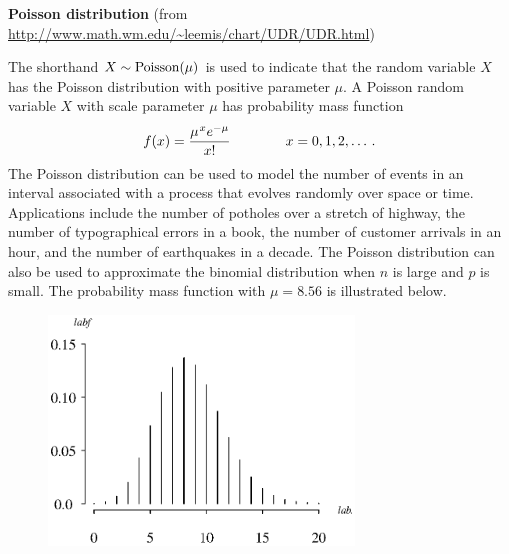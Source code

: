\documentclass[12pt,fullpage]{article}
\begin{document}
\noindent
{\bf Poisson distribution} (from \color{blue}\url{http://www.math.wm.edu/~leemis/chart/UDR/UDR.html}\color{black})

\noindent
The shorthand $X \sim {\rm Poisson}(\mu)$ is used to indicate that the
random variable $X$ has the Poisson distribution with positive parameter $\mu$.
A Poisson random variable $X$ with scale parameter $\mu$ has probability mass function 
$$
f(x) = \frac{\mu ^ {\kern 0.08 em x} e ^ {-\mu}} {x!} \qquad \qquad x = 0,1,2 , \ldots \,.
$$
The Poisson distribution can be used to model the number of events in an interval associated
with a process that evolves randomly over space or time.
Applications include the number of potholes over a stretch of highway, the number of typographical errors
in a book, the number of customer arrivals in an hour, and the number of earthquakes in a decade.
The Poisson distribution can also be used to approximate the binomial distribution when $n$ is
large and $p$ is small.
The probability mass function with $\mu = 8.56$ is illustrated below.
{\begin{figure}[h!]
\begin{center}
\includegraphics[width=3.2in]{PoissonPlot.ps}
\end{center}
\end{figure}}
\end{document}
